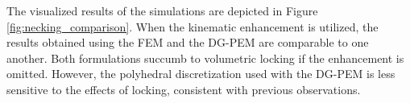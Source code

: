 
The visualized results of the simulations are depicted in Figure \ref{fig:necking_comparison}. When the kinematic enhancement is utilized, the results obtained using the FEM and the DG-PEM are comparable to one another. Both formulations succumb to volumetric locking if the enhancement is omitted. However, the polyhedral discretization used with the DG-PEM is less sensitive to the effects of locking, consistent with previous observations.

